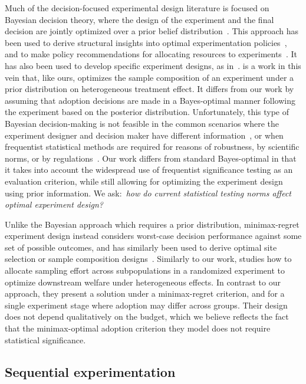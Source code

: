 Much of the decision-focused experimental design literature is focused on Bayesian decision theory, where the design of the experiment and the final decision are jointly optimized over a prior belief distribution~\cite{RyanDr16,NgIm26}.
This approach has been used to derive structural insights into optimal experimentation policies~\cite{RadnerSt84,DeLaraGi07,AzevedoDe20}, and to make policy recommendations for allocating resources to experiments~\cite{FenwickSt20}.
It has also been used to develop specific experiment designs, as in~\textcite{Heath22,FlightJu22,ChenWi13,FrazierPo09,GechterHi24}.
\textcite{GechterHi24} is a work in this vein that, like ours, optimizes the sample composition of an experiment under a prior distribution on heterogeneous treatment effect.
It differs from our work by assuming that adoption decisions are made in a Bayes-optimal manner following the experiment based on the posterior distribution.
Unfortunately, this type of Bayesian decision-making is not feasible in the common scenarios where the experiment designer and decision maker have different information~\cite{BatesJo22,BatesJo23,Min23}, or when frequentist statistical methods are required for reasons of robustness, by scientific norms, or by regulations~\cite{WassersteinLa16,BanerjeeCh20,Recht25}.
Our work differs from standard Bayes-optimal in that it takes into account the widespread use of frequentist significance testing as an evaluation criterion, while still allowing for optimizing the experiment design using prior information.
We ask:~\emph{how do current statistical testing norms affect optimal experiment design?}

Unlike the Bayesian approach which requires a prior distribution, minimax-regret experiment design instead considers worst-case decision performance against some set of possible outcomes, and has similarly been used to derive optimal site selection or sample composition designs~\cite{OleaPr25,HuZh24}.
Similarly to our work, \textcite{HuZh24} studies how to allocate sampling effort across subpopulations in a randomized experiment to optimize downstream welfare under heterogeneous effects.
In contrast to our approach, they present a solution under a minimax-regret criterion, and for a single experiment stage where adoption may differ across groups. Their design does not depend qualitatively on the budget, which we believe reflects the fact that the minimax-optimal adoption criterion they model does not require statistical significance.

\subsection{Sequential experimentation}


